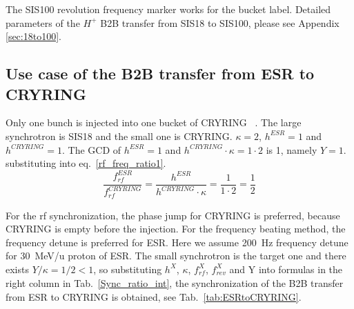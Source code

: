 The SIS100 revolution frequency marker works for the bucket label. Detailed parameters of the $H^{+}$ B2B transfer from SIS18 to SIS100, please see Appendix \ref{sec:18to100}.
\subsection{Use case of the B2B transfer from ESR to CRYRING}
Only one bunch is injected into one bucket of CRYRING ~\cite{herfurth_low_2013, lestinsky_cryring_2015}. The large synchrotron is SIS18 and the small one is CRYRING. $\kappa=2$, $h^{\mathit{ESR}}=1$ and $h^{\mathit{CRYRING}}=1$. The GCD of $h^{\mathit{ESR}}=1$ and $h^{\mathit{CRYRING}} \cdot \kappa=1\cdot 2$ is 1, namely $Y=1$. substituting into eq.~\ref{rf_freq_ratio1}. 
\begin{equation}
\frac{f_{\mathit{rf}}^{\mathit{ESR}}}{f_{\mathit{rf}}^{\mathit{CRYRING}}}= \frac {h^{\mathit{ESR}}}{h^{\mathit{CRYRING}} \cdot \kappa}= \frac{1}{1 \cdot 2}=\frac{1}{2}
\end{equation}

For the rf synchronization, the phase jump for CRYRING is preferred, because CRYRING is empty before the injection. For the frequency beating method, the frequency detune is preferred for ESR. Here we assume \SI{200}{Hz} frequency detune for \SI{30}{MeV/\atomicmassunit} proton of ESR. The small synchrotron is the target one and there exists $Y/\kappa=1/2<1$, so substituting $h^X$, $\kappa$, $f_{\mathit{rf}}^{X}$, $f_{\mathit{rev}}^{X}$ and Y into formulas in the right column in Tab.~\ref{Sync_ratio_int}, the synchronization of the B2B transfer from ESR to CRYRING is obtained, see Tab.~\ref{tab:ESRtoCRYRING}.

